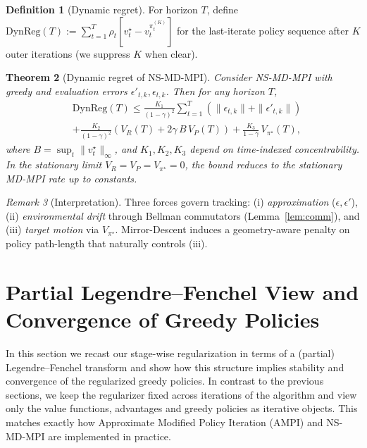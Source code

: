 \documentclass{article}
\theoremstyle{plain}
\newtheorem{theorem}{Theorem}[section]
\theoremstyle{definition}
\newtheorem{definition}[theorem]{Definition}
\theoremstyle{remark}
\newtheorem{remark}[theorem]{Remark}
\newcommand{\1}{\mathbbm{1}}
\begin{document}
\begin{definition}[Dynamic regret]
For horizon $T$, define $\mathrm{DynReg}(T):=\sum_{t=1}^{T}\rho_t\!\left[v^\star_t - v^{\pi^{(K)}_t}_t\right]$ for the last-iterate policy sequence after $K$ outer iterations (we suppress $K$ when clear). 
\end{definition}

\begin{theorem}[Dynamic regret of NS-MD-MPI]\label{thm:dyn}
Consider NS-MD-MPI with greedy and evaluation errors $\epsilon'_{t,k},\epsilon_{t,k}$. Then for any horizon $T$,
\begin{align}
&\mathrm{DynReg}(T)
\le
\frac{K_1}{(1-\gamma)^2}\sum_{t=1}^{T}\!\left(\|\epsilon_{t,k}\|+\|\epsilon'_{t,k}\|\right)\\
&+\frac{K_2}{(1-\gamma)^2}\!\left(V_R(T)+2\gamma\,B\,V_P(T)\right)
+\frac{K_3}{1-\gamma}\,V_{\pi^\star}(T),\label{eq:dyn-main}
\end{align}
where $B=\sup_t\|v^{\star}_t\|_\infty$, and $K_1,K_2,K_3$ depend on time-indexed concentrability. In the stationary limit $V_R=V_P=V_{\pi^\star}=0$, the bound reduces to the stationary MD-MPI rate up to constants.
\end{theorem}

\begin{remark}[Interpretation]
Three forces govern tracking: (i) \emph{approximation} ($\epsilon,\epsilon'$), (ii) \emph{environmental drift} through Bellman commutators (Lemma~\ref{lem:comm}), and (iii) \emph{target motion} via $V_{\pi^\star}$. Mirror-Descent induces a geometry-aware penalty on policy path-length that naturally controls (iii).
\end{remark}

\section{Partial Legendre--Fenchel View and Convergence of Greedy Policies}

In this section we recast our stage-wise regularization in terms of a (partial) Legendre--Fenchel transform and show how this structure implies stability and convergence of the regularized greedy policies. In contrast to the previous sections, we keep the regularizer fixed across iterations of the algorithm and view only the value functions, advantages and greedy policies as iterative objects. This matches exactly how Approximate Modified Policy Iteration (AMPI) and NS-MD-MPI are implemented in practice.
\end{document}
